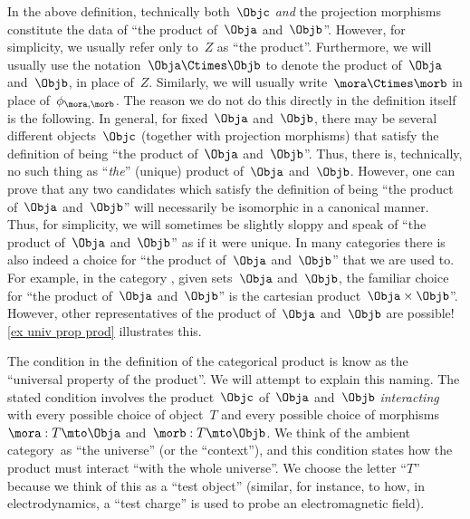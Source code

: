 \begin{remark}
  \label{prod unique up to iso}
  In the above definition, technically both~$\Objc$ \emph{and} the projection morphisms constitute the data of ``the product of~$\Obja$ and~$\Objb$''. However, for simplicity, we usually refer only to~$Z$ as ``the product''. Furthermore, we will usually use the notation~$\Obja \Ctimes \Objb$ to denote the product of~$\Obja$ and~$\Objb$, in place of~$Z$. Similarly, we will usually write~$\mora \Ctimes \morb$ in place of~$\phi_{\mora, \morb}$. The reason we do not do this directly in the definition itself is the following. In general, for fixed~$\Obja$ and~$\Objb$, there may be several different objects~$\Objc$ (together with projection morphisms) that satisfy the definition of being ``the product of~$\Obja$ and~$\Objb$''. Thus, there is, technically, no such thing as ``\emph{the}'' (unique) product of~$\Obja$ and~$\Objb$. However, one can prove that any two candidates which satisfy the definition of being ``the product of~$\Obja$ and~$\Objb$'' will necessarily be isomorphic in a canonical manner. Thus, for simplicity, we will sometimes be slightly sloppy and speak of ``the product of~$\Obja$ and~$\Objb$'' as if it were unique. In many categories there is also indeed a choice for ``the product of~$\Obja$ and~$\Objb$'' that we are used to. For example, in the category \Set, given sets~$\Obja$ and~$\Objb$, the familiar choice for ``the product of~$\Obja$ and~$\Objb$'' is the cartesian product~$\Obja \times \Objb$''. However, other representatives of the product of~$\Obja$ and~$\Objb$ are possible! \cref{ex univ prop prod} illustrates this.
\end{remark}

\begin{remark}
  The condition in the definition of the categorical product is know as the ``universal property of the product''. We will attempt to explain this naming. The stated condition involves the product~$\Objc$ of~$\Obja$ and~$\Objb$ \emph{interacting} with every possible choice of object~$T$ and every possible choice of morphisms~$\mora : T \mto \Obja$ and~$\morb: T \mto \Objb$. We think of the ambient category~\CatC as ``the universe'' (or the ``context''), and this condition states how the product must interact ``with the whole universe''.
  We choose the letter ``$T$'' because we think of this as a ``test object'' (similar, for instance,  to how, in electrodynamics, a ``test charge'' is used to probe an electromagnetic field).
\end{remark}


